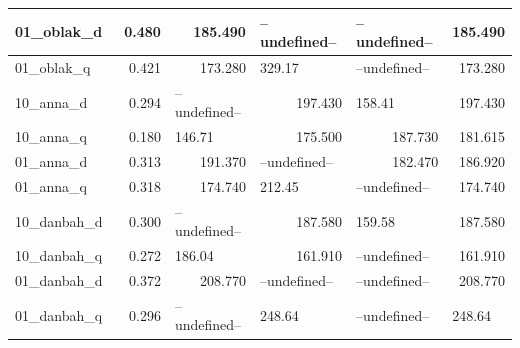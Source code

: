 \documentclass[a4paper]{article}
\begin{document}
\begin{table}[H]
\begin{tabular}{|l|r|l|r|l|r|}
\hline
01\_oblak\_d~   & 0.480                         & \multicolumn{1}{r|}{185.490} & \multicolumn{1}{l|}{--undefined--} & --undefined--                & 185.490                          \\ 
\hline
01\_oblak\_q~   & 0.421                         & \multicolumn{1}{r|}{173.280} & \multicolumn{1}{l|}{329.17}        & --undefined--                & 173.280                          \\ 
\hline
10\_anna\_d~    & 0.294                         & --undefined--                & 197.430                            & 158.41                       & 197.430                          \\ 
\hline
10\_anna\_q~    & 0.180                         & 146.71                       & 175.500                            & \multicolumn{1}{r|}{187.730} & 181.615                          \\ 
\hline
01\_anna\_d~    & 0.313                         & \multicolumn{1}{r|}{191.370} & \multicolumn{1}{l|}{--undefined--} & \multicolumn{1}{r|}{182.470} & 186.920                          \\ 
\hline
01\_anna\_q~    & 0.318                         & \multicolumn{1}{r|}{174.740} & \multicolumn{1}{l|}{212.45}        & --undefined--                & 174.740                          \\ 
\hline
10\_danbah\_d~  & 0.300                         & --undefined--                & 187.580                            & 159.58                       & 187.580                          \\ 
\hline
10\_danbah\_q~  & 0.272                         & 186.04                       & 161.910                            & --undefined--                & 161.910                          \\ 
\hline
01\_danbah\_d~  & 0.372                         & \multicolumn{1}{r|}{208.770} & \multicolumn{1}{l|}{--undefined--} & --undefined--                & 208.770                          \\ 
\hline
01\_danbah\_q~  & 0.296                         & --undefined--                & \multicolumn{1}{l|}{248.64}        & --undefined--                & \multicolumn{1}{l|}{248.64}      \\ 

\end{tabular}
\end{table}
\end{document}
